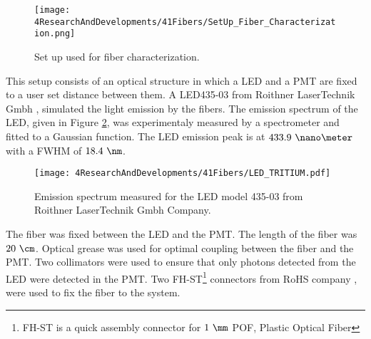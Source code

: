 \begin{figure}[h]
\centering
\texttt{[image: 4ResearchAndDevelopments/41Fibers/SetUp\_Fiber\_Characterization.png]}
\caption{Set up used for fiber characterization.\label{fig:SetUpFiberCharacterization}}
\end{figure}

This setup consists of an optical structure in which a LED and a PMT are fixed to a user set distance between them. A LED435-03 from Roithner LaserTechnik Gmbh \cite{LEDRLT}, simulated the light emission by the fibers. The emission spectrum of the LED, given in Figure \ref{fig:LEDSpectrumTritium}, was experimentaly measured by a spectrometer and fitted to a Gaussian function. The LED emission peak is at $433.9~\nano\meter$ with a FWHM of $18.4~\nm$. 

\begin{figure}[h]
\centering
\texttt{[image: 4ResearchAndDevelopments/41Fibers/LED\_TRITIUM.pdf]}
\caption{Emission spectrum measured for the LED model 435-03 from Roithner LaserTechnik Gmbh Company.\label{fig:LEDSpectrumTritium}}
\end{figure}

The fiber was fixed between the LED and the PMT. The length of the fiber was $20~\cm$. Optical grease \cite{OpticalGrease} was used for optimal coupling between the fiber and the PMT. Two collimators were used to ensure that only photons detected from the LED were detected in the PMT. Two FH-ST\footnote{FH-ST is a quick assembly connector for $1~\mm$ POF, Plastic Optical Fiber} connectors from RoHS company \cite{}, were used to fix the fiber to the system. 